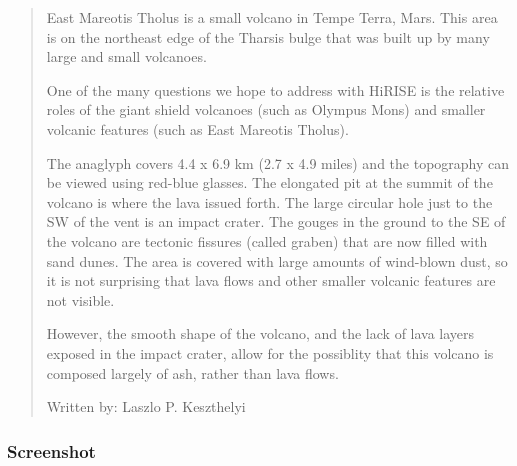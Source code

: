 \begin{quotation}
East Mareotis Tholus is a small volcano in Tempe Terra, Mars. This
area is on the northeast edge of the Tharsis bulge that was built up
by many large and small volcanoes.

One of the many questions we hope to address with HiRISE is the
relative roles of the giant shield volcanoes (such as Olympus Mons)
and smaller volcanic features (such as East Mareotis Tholus).

The anaglyph covers 4.4 x 6.9 km (2.7 x 4.9 miles) and the topography
can be viewed using red-blue glasses. The elongated pit at the summit
of the volcano is where the lava issued forth. The large circular hole
just to the SW of the vent is an impact crater. The gouges in the
ground to the SE of the volcano are tectonic fissures (called graben)
that are now filled with sand dunes. The area is covered with large
amounts of wind-blown dust, so it is not surprising that lava flows
and other smaller volcanic features are not visible.

However, the smooth shape of the volcano, and the lack of lava layers
exposed in the impact crater, allow for the possiblity that this
volcano is composed largely of ash, rather than lava flows.

Written by: Laszlo P. Keszthelyi
\end{quotation}

\subsubsection*{Screenshot}

